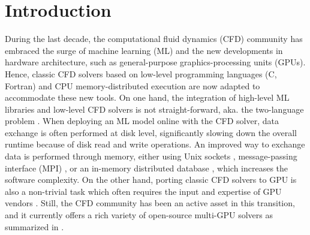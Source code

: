 \documentclass[10pt,a4paper]{article}
\begin{document}
\section{Introduction}
During the last decade, the computational fluid dynamics (CFD) community has embraced the surge of machine learning (ML) and the new developments in hardware architecture, such as general-purpose graphics-processing units (GPUs). Hence, classic CFD solvers based on low-level programming languages (C, Fortran) and CPU memory-distributed execution are now adapted to accommodate these new tools. On one hand, the integration of high-level ML libraries and low-level CFD solvers is not straight-forward, aka. the two-language problem \citep{Churavy2022}. When deploying an ML model online with the CFD solver, data exchange is often performed at disk level, significantly slowing down the overall runtime because of disk read and write operations. An improved way to exchange data is performed through memory, either using Unix sockets \citep{Rabault2019, Font2021}, message-passing interface (MPI) \citep{Guastoni2023}, or an in-memory distributed database \citep{Kurz2022,Font2024,Font2025}, which increases the software complexity. On the other hand, porting classic CFD solvers to GPU is also a non-trivial task which often requires the input and expertise of GPU vendors \citep{Romero2022}. Still, the CFD community has been an active asset in this transition, and it currently offers a rich variety of open-source multi-GPU solvers as summarized in .
\end{document}
